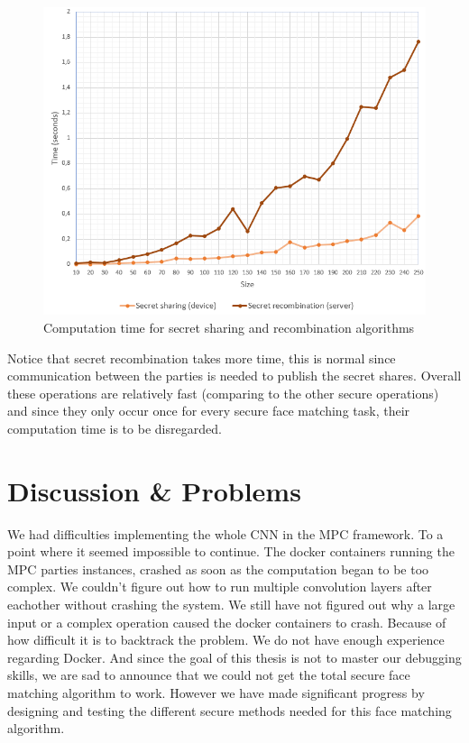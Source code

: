 \begin{figure}[H]
  \includegraphics[scale=0.7]{fig/secret_test.png}
  \centering
  \caption{Computation time for secret sharing and recombination algorithms}
  \label{fig:secret_test}
\end{figure}

Notice that secret recombination takes more time, this is normal since communication between the parties is needed to publish the secret shares. Overall these operations are relatively fast (comparing to the other secure operations) and since they only occur once for every secure face matching task, their computation time is to be disregarded.

\section{Discussion \& Problems}
We had difficulties implementing the whole CNN in the MPC framework. To a point where it seemed impossible to continue. The docker containers running the MPC parties instances, crashed as soon as the computation began to be too complex. We couldn't figure out how to run multiple convolution layers after eachother without crashing the system. We still have not figured out why a large input or a complex operation caused the docker containers to crash. Because of how difficult it is to backtrack the problem. We do not have enough experience regarding Docker. And since the goal of this thesis is not to master our debugging skills, we are sad to announce that we could not get the total secure face matching algorithm to work. However we have made significant progress by designing and testing the different secure methods needed for this face matching algorithm.\\

